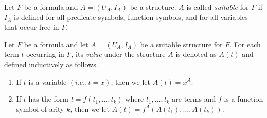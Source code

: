 Let $F$ be a formula and $A = (U_A, I_A)$ be a structure.
$A$ is called \textit{suitable} for $F$ if $I_A$ is defined for all predicate symbols, function symbols, and for all variables that occur free in $F$.

Let $F$ be a formula and let $A = (U_A, I_A)$ be a suitable structure for $F$.
For each term $t$ occurring in $F$, its \textit{value} under the structure $A$ is denoted as $A(t)$ and defined inductively as follows.

\begin{enumerate}
    \item If $t$ is a variable $(i.e., t = x)$, then we let $A(t) = x^A$.
    \item If $t$ has the form $t = f(t_1, \ldots, t_k)$ where $t_1, \ldots, t_k$ are terms and $f$ is a function symbol of arity $k$, then we let $A(t) = f^A(A(t_1),\ldots , A(t_k))$.
\end{enumerate}

